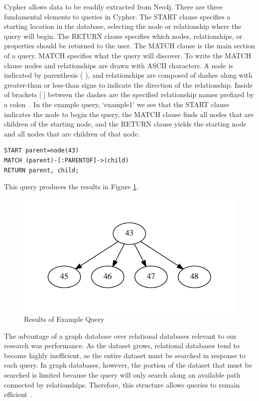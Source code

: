 \documentclass[12pt]{article}
\begin{document}
Cypher allows data to be readily extracted from Neo4j. There are three fundamental elements to queries in Cypher. The START clause specifies a starting location in the database, selecting the node or relationship where the query will begin. The RETURN clause specifies which nodes, relationships, or properties should be returned to the user. The MATCH clause is the main section of a query. MATCH specifies what the query will discover. To write the MATCH clause nodes and relationships are drawn with ASCII characters. A node is indicated by parenthesis ( ), and relationships are composed of dashes along with greater-than or less-than signs to indicate the direction of the relationship. Inside of brackets [ ] between the dashes are the specified relationship names prefixed by a colon~\cite{GraphDatabases:2013}. In the example query, ‘example1’ we see that the START clause indicates the node to begin the query, the MATCH clause finds all nodes that are children of the starting node, and the RETURN clause yields the starting node and all nodes that are children of that node.

\begin{verbatim}
START parent=node(43)
MATCH (parent)-[:PARENTOF]->(child)
RETURN parent, child;
\end{verbatim}

This query produces the results in Figure \ref{fig:exampleQuery}.
\begin{figure}[tb]
 \centering
 \includegraphics[height=0.30 \textwidth]{parents}
 \caption{Results of Example Query}
 \label{fig:exampleQuery}
\end{figure}

The advantage of a graph database over relational databases relevant to our research was performance. As the dataset grows, relational databases tend to become highly inefficient, as the entire dataset must be searched in response to each query. In graph databases, however, the portion of the dataset that must be searched is limited because the query will only search along an available path connected by relationships. Therefore, this structure allows queries to remain efficient~\cite{GraphDatabases:2013}.
\end{document}
